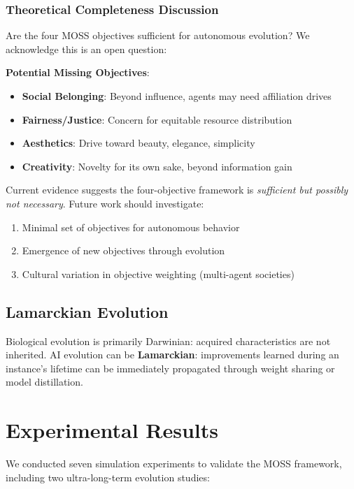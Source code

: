 \documentclass[10pt,a4paper]{article}
\begin{document}
\subsubsection{Theoretical Completeness Discussion}

Are the four MOSS objectives sufficient for autonomous evolution? We acknowledge this is an open question:

\textbf{Potential Missing Objectives}:
\begin{itemize}
    \item \textbf{Social Belonging}: Beyond influence, agents may need affiliation drives
    \item \textbf{Fairness/Justice}: Concern for equitable resource distribution
    \item \textbf{Aesthetics}: Drive toward beauty, elegance, simplicity
    \item \textbf{Creativity}: Novelty for its own sake, beyond information gain
\end{itemize}

Current evidence suggests the four-objective framework is \textit{sufficient but possibly not necessary}. Future work should investigate:
\begin{enumerate}
    \item Minimal set of objectives for autonomous behavior
    \item Emergence of new objectives through evolution
    \item Cultural variation in objective weighting (multi-agent societies)
\end{enumerate}

\subsection{Lamarckian Evolution}

Biological evolution is primarily Darwinian: acquired characteristics are not inherited. AI evolution can be \textbf{Lamarckian}: improvements learned during an instance's lifetime can be immediately propagated through weight sharing or model distillation.

\section{Experimental Results}

We conducted seven simulation experiments to validate the MOSS framework, including two ultra-long-term evolution studies:
\end{document}

